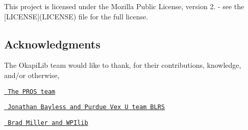 This project is licensed under the Mozilla Public License, version 2. -\/ see the \mbox{[}L\+I\+C\+E\+N\+SE\mbox{]}(L\+I\+C\+E\+N\+SE) file for the full license.

\subsection*{Acknowledgments}

The Okapi\+Lib team would like to thank, for their contributions, knowledge, and/or otherwise,
\begin{DoxyItemize}
\item \href{https://github.com/purduesigbots}{\texttt{ The P\+R\+OS team}}
\item \href{https://github.com/purduesigbots/libblrs}{\texttt{ Jonathan Bayless and Purdue Vex U team B\+L\+RS}}
\item \href{https://github.com/wpilibsuite/allwpilib}{\texttt{ Brad Miller and W\+P\+Ilib}} 
\end{DoxyItemize}
